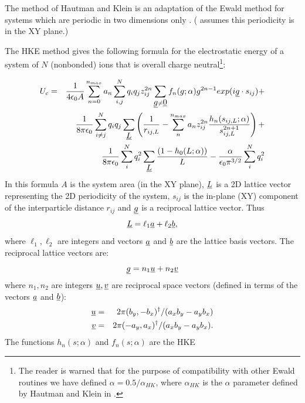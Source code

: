 The method of Hautman and Klein is an adaptation of the Ewald method
for systems which are periodic in two dimensions only
\cite{hautman-92a}. (\D{} assumes this periodicity is in the XY plane.)

The HKE method gives the following formula for the electrostatic
energy of a system of $N$ (nonbonded) ions that is overall charge
neutral\footnote{The reader is warned that for the purpose of
compatibility with other \D{} Ewald routines we have defined
$\alpha=0.5/\alpha_{HK}$, where $\alpha_{HK}$ is the $\alpha$ parameter
defined by Hautman and Klein in \cite{hautman-92a}.}:

\begin{eqnarray}
U_{c} &=&\frac{1}{4\epsilon_{0}A}\sum_{n=0}^{n_{max}}a_{n}\sum_{i,j}^{N} 
q_{i}q_{j}z_{ij}^{2n}\sum_{\mbox{$\underline{g}$}\ne \mbox{$\underline{0}$}} f_{n}(g;\alpha)
g^{2n-1}exp(i\mbox{$\underline{g}$}\cdot s_{ij}) + \nonumber \\
 & & \frac{1}{8\pi\epsilon_{0}}\sum_{i\ne j}^{N}q_{i}q_{j}\sum_{\mbox{$\underline{L}$}}
\left ( \frac{1}{r_{ij,L}}-\sum_{n}^{n_{max}} a_{n}z_{ij}^{2n}
\frac{h_{n}(s_{ij,L};\alpha)}{s_{ij,L}^{2n+1}}\right )+\nonumber \\
 & & \frac{1}{8\pi\epsilon_{0}}\sum_{i}^{N}q_{i}^{2}\sum_{\mbox{$\underline{L}$}}
\frac{(1-h_{0}(L;\alpha))}{L}-\frac{\alpha}{\epsilon_{0}\pi^{3/2}}\sum_{i}^{N}q_{i}^{2} \label{hke}
\end{eqnarray}
In this formula $A$ is the system area (in the
XY plane), $\mbox{$\underline{L}$}$ is a 2D lattice vector representing the 2D
periodicity of the system, $s_{ij}$ is the in-plane (XY) component of
the interparticle distance $r_{ij}$ and $\mbox{$\underline{g}$}$ is a reciprocal
lattice vector. Thus
\begin{equation}
\mbox{$\underline{L}$}=\ell_{1}\mbox{$\underline{a}$}+\ell_{2}\mbox{$\underline{b}$},
\end{equation}
where $\ell_{1},\ell_{2}$ are integers and vectors $\mbox{$\underline{a}$}$ and
$\mbox{$\underline{b}$}$ are the lattice basis vectors. The reciprocal lattice vectors are:
\begin{equation}
\mbox{$\underline{g}$}=n_{1} \mbox{$\underline{u}$} + n_{2} \mbox{$\underline{v}$}
\end{equation}
where $n_{1},n_{2}$ are integers $\mbox{$\underline{u}$},\mbox{$\underline{v}$}$ are reciprocal space
vectors (defined in terms of the vectors $\mbox{$\underline{a}$}$ and $\mbox{$\underline{b}$}$):
\begin{eqnarray}
\mbox{$\underline{u}$}&=&2\pi(b_{y},-b_{x})^{\dagger}/(a_{x}b_{y}-a_{y}b_{x}) \nonumber \\
\mbox{$\underline{v}$}&=&2\pi(-a_{y},a_{x})^{\dagger}/(a_{x}b_{y}-a_{y}b_{x}).
\end{eqnarray}
The functions $h_{n}(s;\alpha)$ and $f_{n}(s;\alpha)$ are the HKE

